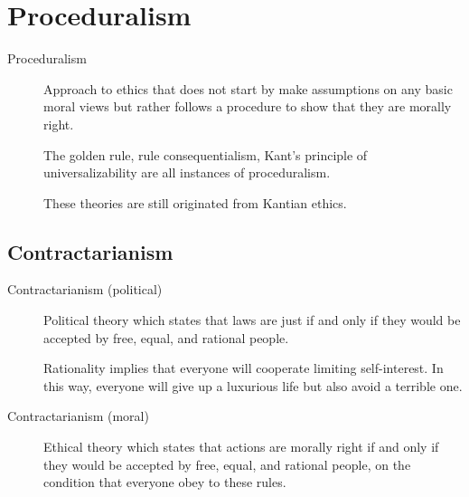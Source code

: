 \section{Proceduralism}

\begin{description}
    \item[Proceduralism] 
        Approach to ethics that does not start by make assumptions on any basic moral views but rather follows a procedure to show that they are morally right.

        \begin{remark}
            The golden rule, rule consequentialism, Kant's principle of universalizability are all instances of proceduralism.
        \end{remark}

        \begin{remark}
            These theories are still originated from Kantian ethics.
        \end{remark}
\end{description}


\subsection{Contractarianism}

\begin{description}
    \item[Contractarianism (political)] 
        Political theory which states that laws are just if and only if they would be accepted by free, equal, and rational people.

        \begin{remark}
            Rationality implies that everyone will cooperate limiting self-interest. In this way, everyone will give up a luxurious life but also avoid a terrible one.
        \end{remark}

    \item[Contractarianism (moral)] 
        Ethical theory which states that actions are morally right if and only if they would be accepted by free, equal, and rational people, on the condition that everyone obey to these rules.
\end{description}

